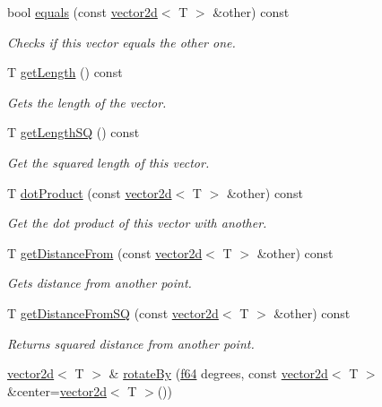 \begin{DoxyCompactItemize}
bool \hyperlink{classirr_1_1core_1_1vector2d_a9b04601d982c880ed599b5bb16cd86a7}{equals} (const \hyperlink{classirr_1_1core_1_1vector2d}{vector2d}$<$ T $>$ \&other) const
\begin{DoxyCompactList}\small\item\em Checks if this vector equals the other one. \end{DoxyCompactList}\item 
T \hyperlink{classirr_1_1core_1_1vector2d_a84b5741d21aa24cfb71b14e350226ab9}{get\+Length} () const
\begin{DoxyCompactList}\small\item\em Gets the length of the vector. \end{DoxyCompactList}\item 
T \hyperlink{classirr_1_1core_1_1vector2d_ac08fae4770172d11cb2811f18fec2d23}{get\+Length\+SQ} () const
\begin{DoxyCompactList}\small\item\em Get the squared length of this vector. \end{DoxyCompactList}\item 
T \hyperlink{classirr_1_1core_1_1vector2d_acf2fea122833c456c6dd66811acc8b91}{dot\+Product} (const \hyperlink{classirr_1_1core_1_1vector2d}{vector2d}$<$ T $>$ \&other) const
\begin{DoxyCompactList}\small\item\em Get the dot product of this vector with another. \end{DoxyCompactList}\item 
T \hyperlink{classirr_1_1core_1_1vector2d_a351a36a3c2fff525fc17ec15c5d0207f}{get\+Distance\+From} (const \hyperlink{classirr_1_1core_1_1vector2d}{vector2d}$<$ T $>$ \&other) const
\begin{DoxyCompactList}\small\item\em Gets distance from another point. \end{DoxyCompactList}\item 
T \hyperlink{classirr_1_1core_1_1vector2d_aaf9107f38ae6a7e9bee6580440b53539}{get\+Distance\+From\+SQ} (const \hyperlink{classirr_1_1core_1_1vector2d}{vector2d}$<$ T $>$ \&other) const
\begin{DoxyCompactList}\small\item\em Returns squared distance from another point. \end{DoxyCompactList}\item 
\hyperlink{classirr_1_1core_1_1vector2d}{vector2d}$<$ T $>$ \& \hyperlink{classirr_1_1core_1_1vector2d_ac9c77997f6594d79d5daa5f6bf690ed2}{rotate\+By} (\hyperlink{namespaceirr_a1325b02603ad449f92c68fc640af9b28}{f64} degrees, const \hyperlink{classirr_1_1core_1_1vector2d}{vector2d}$<$ T $>$ \&center=\hyperlink{classirr_1_1core_1_1vector2d}{vector2d}$<$ T $>$())

\end{DoxyCompactItemize}
